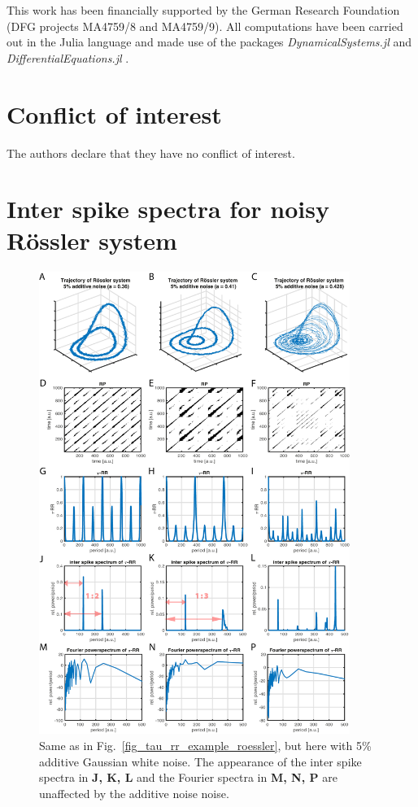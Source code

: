 \begin{acknowledgements}
This work has been financially supported by the German Research Foundation (DFG projects MA4759/8 and MA4759/9). All computations have been carried out in the Julia language 
and made use of the packages \textit{DynamicalSystems.jl} \cite{datseris2018} and \textit{DifferentialEquations.jl} \cite{rackauckas2017}.
\end{acknowledgements}


%
 \section*{Conflict of interest}

 The authors declare that they have no conflict of interest.

\clearpage
\appendix
\section{Inter spike spectra for noisy R\"ossler system}

\begin{figure}[h!]
 \centering
 \includegraphics[width=0.9\textwidth]{./figures/fig_tau_rr_example_roessler_noise}
 \caption{Same as in Fig.~\ref{fig_tau_rr_example_roessler}, but here with 5\% additive Gaussian white noise. The appearance of the inter spike spectra 
 in \textbf{J, K, L} and the Fourier spectra in \textbf{M, N, P} are unaffected by the additive noise noise.
 }
\label{fig_tau_rr_example_roessler_noise}
\end{figure}

